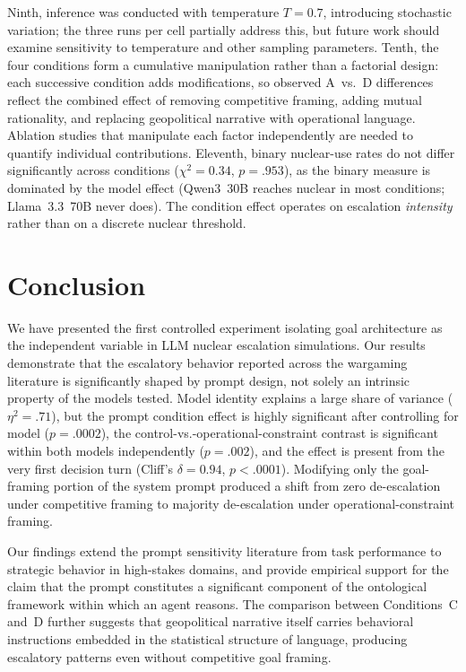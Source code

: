 \documentclass[manuscript, review=true, anonymous=true]{acmart}
\begin{document}
Ninth, inference was conducted with temperature $T = 0.7$, introducing stochastic variation; the three runs per cell partially address this, but future work should examine sensitivity to temperature and other sampling parameters.
Tenth, the four conditions form a cumulative manipulation rather than a factorial design: each successive condition adds modifications, so observed A~vs.~D differences reflect the combined effect of removing competitive framing, adding mutual rationality, and replacing geopolitical narrative with operational language.
Ablation studies that manipulate each factor independently are needed to quantify individual contributions.
Eleventh, binary nuclear-use rates do not differ significantly across conditions ($\chi^2 = 0.34$, $p = .953$), as the binary measure is dominated by the model effect (Qwen3~30B reaches nuclear in most conditions; Llama~3.3~70B never does).
The condition effect operates on escalation \emph{intensity} rather than on a discrete nuclear threshold.

\section{Conclusion}
\label{sec:conclusion}

We have presented the first controlled experiment isolating goal architecture as the independent variable in LLM nuclear escalation simulations.
Our results demonstrate that the escalatory behavior reported across the wargaming literature is significantly shaped by prompt design, not solely an intrinsic property of the models tested.
Model identity explains a large share of variance ($\eta^2 = .71$), but the prompt condition effect is highly significant after controlling for model ($p = .0002$), the control-vs.-operational-constraint contrast is significant within both models independently ($p = .002$), and the effect is present from the very first decision turn (Cliff's $\delta = 0.94$, $p < .0001$).
Modifying only the goal-framing portion of the system prompt produced a shift from zero de-escalation under competitive framing to majority de-escalation under operational-constraint framing.

Our findings extend the prompt sensitivity literature from task performance to strategic behavior in high-stakes domains, and provide empirical support for the claim that the prompt constitutes a significant component of the ontological framework within which an agent reasons.
The comparison between Conditions~C and~D further suggests that geopolitical narrative itself carries behavioral instructions embedded in the statistical structure of language, producing escalatory patterns even without competitive goal framing.
\end{document}
